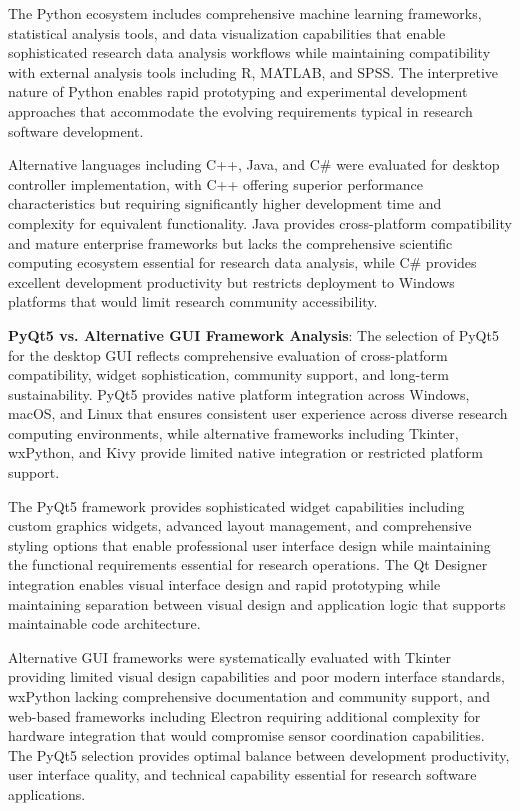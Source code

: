 \documentclass[11pt,a4paper]{report}
\begin{document}
The Python ecosystem includes comprehensive machine learning frameworks, statistical analysis tools, and data
visualization capabilities that enable sophisticated research data analysis workflows while maintaining compatibility
with external analysis tools including R, MATLAB, and SPSS. The interpretive nature of Python enables rapid prototyping
and experimental development approaches that accommodate the evolving requirements typical in research software
development.

Alternative languages including C++, Java, and C\# were evaluated for desktop controller implementation, with C++
offering superior performance characteristics but requiring significantly higher development time and complexity for
equivalent functionality. Java provides cross-platform compatibility and mature enterprise frameworks but lacks the
comprehensive scientific computing ecosystem essential for research data analysis, while C\# provides excellent
development productivity but restricts deployment to Windows platforms that would limit research community
accessibility.

\textbf{PyQt5 vs. Alternative GUI Framework Analysis}: The selection of PyQt5 for the desktop GUI reflects comprehensive
evaluation of cross-platform compatibility, widget sophistication, community support, and long-term sustainability.
PyQt5 provides native platform integration across Windows, macOS, and Linux that ensures consistent user experience
across diverse research computing environments, while alternative frameworks including Tkinter, wxPython, and Kivy
provide limited native integration or restricted platform support.

The PyQt5 framework provides sophisticated widget capabilities including custom graphics widgets, advanced layout
management, and comprehensive styling options that enable professional user interface design while maintaining the
functional requirements essential for research operations. The Qt Designer integration enables visual interface design
and rapid prototyping while maintaining separation between visual design and application logic that supports
maintainable code architecture.

Alternative GUI frameworks were systematically evaluated with Tkinter providing limited visual design capabilities and
poor modern interface standards, wxPython lacking comprehensive documentation and community support, and web-based
frameworks including Electron requiring additional complexity for hardware integration that would compromise sensor
coordination capabilities. The PyQt5 selection provides optimal balance between development productivity, user interface
quality, and technical capability essential for research software applications.
\end{document}
